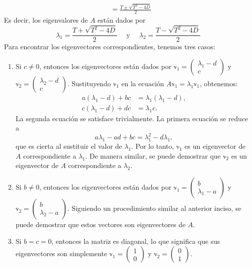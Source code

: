 \begin{tcolorbox}
\begin{align*}
        & = \frac{T \pm \sqrt{T^2 - 4D}}{2}
    \end{align*}
    Es decir, los eigenvalores de $A$ están dados por
    $$\lambda_1 = \frac{T + \sqrt{T^2 - 4D}}{2} \quad \text{ y } \quad \lambda_2 = \frac{T - \sqrt{T^2 - 4D}}{2}$$
    Para encontrar los eigenvectores correspondientes, tenemos tres casos:
    \begin{enumerate}[label=\roman*)]
        \item Si $c \neq 0$, entonces los eigenvectores están dados por $\mathbb{v}_1 = \begin{pmatrix} \lambda_1 - d \\ c \end{pmatrix}$ y $\mathbb{v}_2 = \begin{pmatrix} \lambda_2 - d \\ c \end{pmatrix}$. Sustituyendo $\mathbb{v}_1$ en la ecuación $A\mathbb{v}_1 = \lambda_1\mathbb{v}_1$, obtenemos:
        \begin{align*}
            a(\lambda_1 - d) + bc &= \lambda_1 (\lambda_1 - d), \\
            c(\lambda_1 - d) + dc &= \lambda_1 c.
        \end{align*}
        La segunda ecuación se satisface trivialmente. La primera ecuación se reduce a
        $$a\lambda_1 - ad + bc = \lambda_1^2 - d\lambda_1,$$
        que es cierta al sustituir el valor de $\lambda_1$. Por lo tanto, $\mathbb{v}_1$ es un eigenvector de $A$ correspondiente a $\lambda_1$. De manera similar, se puede demostrar que $\mathbb{v}_2$ es un eigenvector de $A$ correspondiente a $\lambda_2$.
        \item Si $b \neq 0$, entonces los eigenvectores están dados por $\mathbb{v}_1 = \begin{pmatrix} b \\ \lambda_1 - a \end{pmatrix}$ y $\mathbb{v}_2 = \begin{pmatrix} b \\ \lambda_2 - a \end{pmatrix}$. Siguiendo un procedimiento similar al anterior inciso, se puede demostrar que estos vectores son eigenvectores de $A$.
        \item Si $b = c = 0$, entonces la matriz es diagonal, lo que significa que sus eigenvectores son simplemente $\mathbb{v}_1 = \begin{pmatrix} 1 \\ 0 \end{pmatrix}$ y $\mathbb{v}_2 = \begin{pmatrix} 0 \\ 1 \end{pmatrix}$.
    \end{enumerate}
\end{tcolorbox}

